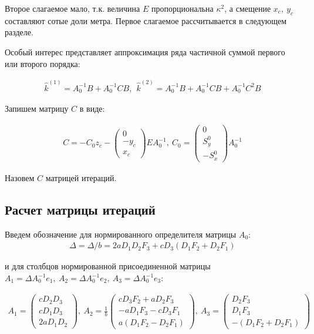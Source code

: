 Второе слагаемое мало, т.к. величина $E$ пропорциональна $\kappa^2$, а смещение $x_c,~y_c$ составляют сотые доли метра. Первое слагаемое рассчитывается в следующем разделе.

Особый интерес представляет аппроксимация ряда частичной суммой первого или второго порядка:

\begin{equation}
\begin{aligned}
	\hat{k}^{(1)} = A_0^{-1}B + A_0^{-1}CB, ~~ \hat{k}^{(2)} = A_0^{-1}B + A_0^{-1}CB  + A_0^{-1}C^2B
\end{aligned}
\end{equation}

Запишем матрицу $C$ в виде:

\begin{equation}
\begin{aligned}
	C = -C_0z_c - \begin{pmatrix}0 \\ -y_c \\ x_c \end{pmatrix}EA_0^{-1}, ~C_0 = \begin{pmatrix}0 \\ S_y^0 \\ -S_x^0 \end{pmatrix}A_0^{-1}
\end{aligned}
\end{equation}

Назовем $C$ матрицей итераций.

\subsection{Расчет матрицы итераций}

Введем обозначение для нормированного определителя матрицы $A_0$:
\begin{equation}
\begin{aligned}
	\Delta = \Delta/b = 2aD_1D_2F_3 + cD_3\left(D_1F_2 + D_2F_1\right)
\end{aligned}
\end{equation}

и для столбцов нормированной присоединенной матрицы $A_1 = \Delta A_0^{-1}e_1,~A_2 = \Delta A_0^{-1}e_2,~A_3 = \Delta A_0^{-1}e_3$:

\begin{equation}
\begin{aligned}
	A_1 = \begin{pmatrix}cD_2D_3 \\ cD_1D_3 \\ 2aD_1D_2\end{pmatrix},~ A_2 = \frac{1}{b}\begin{pmatrix}cD_3F_2 + aD_2F_3 \\ -aD_1F_3-cD_3F_1 \\ a\left(D_1F_2-D_2F_1\right)\end{pmatrix}, ~A_3=\begin{pmatrix}D_2F_3 \\ D_1F_3 \\ -\left(D_1F_2 + D_2F_1\right) \end{pmatrix}
\end{aligned}
\end{equation}

